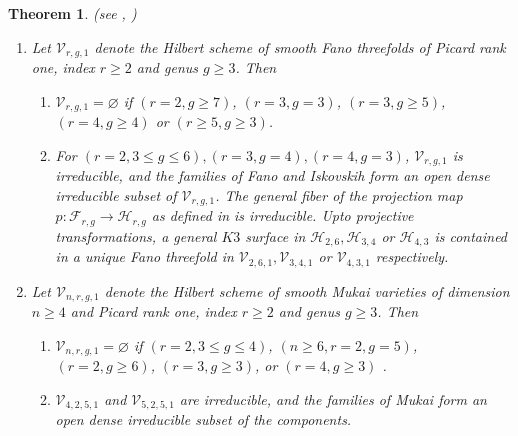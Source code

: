 \documentclass[11pt,twoside]{amsart}
\theoremstyle{plain}
\numberwithin{equation}{section}
\newtheorem{theorem}{Theorem}[section]
\theoremstyle{definition}
\begin{document}
\smallskip



\begin{theorem}(see , )\label{classification of mukai varieties intro}
\begin{enumerate}
    \item Let $\mathcal{V}_{r,g,1}$ denote the Hilbert scheme of smooth Fano threefolds of Picard rank one, index $r \geq 2$ and genus $g \geq 3$. Then

\begin{enumerate}
    \item $\mathcal{V}_{r,g,1} = \varnothing$ if $(r = 2, g \geq 7)$, $(r = 3, g = 3)$, $(r = 3, g \geq 5)$, $(r = 4, g \geq 4)$ or $(r \geq 5, g \geq 3)$. 
    \item For $(r = 2, 3 \leq g \leq 6), (r = 3, g = 4), (r = 4, g = 3)$, $\mathcal{V}_{r,g,1}$ is irreducible, and the families of Fano and Iskovskih form an open dense irreducible subset of $\mathcal{V}_{r,g,1}$. The general fiber of the projection map $p: \mathcal{F}_{r,g} \to \mathcal{H}_{r,g}$ as defined in  is irreducible. Upto projective transformations, a general $K3$ surface in $\mathcal{H}_{2,6}, \mathcal{H}_{3,4}$ or $ \mathcal{H}_{4,3}$ is contained in a unique Fano threefold in $\mathcal{V}_{2,6,1}, \mathcal{V}_{3,4,1}$ or $ \mathcal{V}_{4,3,1}$ respectively.
\end{enumerate}

\item Let $\mathcal{V}_{n,r,g,1}$ denote the Hilbert scheme of smooth Mukai varieties of dimension $n \geq 4$ and Picard rank one, index $r \geq 2$ and genus $g \geq 3$. Then 
\begin{enumerate}
    \item $\mathcal{V}_{n,r,g,1} = \varnothing$ if $(r = 2, 3 \leq g \leq 4)$, $(n \geq 6, r = 2, g = 5)$, $(r = 2, g \geq 6)$, $(r = 3, g \geq 3)$, or $(r = 4, g \geq 3)$ . 
    \item $\mathcal{V}_{4,2,5,1}$ and $\mathcal{V}_{5,2,5,1}$ are irreducible, and the families of Mukai form an open dense irreducible subset of the components.
\end{enumerate}

\end{enumerate} 

\end{theorem}
\end{document}
